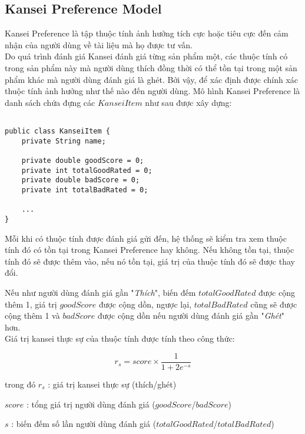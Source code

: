 \subsection{Kansei Preference Model}

Kansei Preference là tập thuộc tính ảnh hưởng tích cực hoặc tiêu cực đến cảm nhận của người dùng về tài liệu mà họ được tư vấn.\\

Do quá trình đánh giá Kansei đánh giá từng sản phẩm một, các thuộc tính có trong sản phẩm này mà người dùng thích đồng thời có thể tồn tại trong một sản phẩm khác mà người dùng đánh giá là ghét. Bởi vậy, để xác định được chính xác thuộc tính ảnh hưởng như thế nào đến người dùng. Mô hình Kansei Preference là danh sách chứa đựng các $KanseiItem$ như sau được xây dựng:

\begin{lstlisting}[style=javacode, breaklines=true]

public class KanseiItem {
    private String name;

    private double goodScore = 0;
    private int totalGoodRated = 0;
    private double badScore = 0;
    private int totalBadRated = 0;
    
    ...
}
\end{lstlisting}

Mỗi khi có thuộc tính được đánh giá gửi đến, hệ thống sẽ kiểm tra xem thuộc tính đó có tồn tại trong Kansei Preference hay không. Nếu không tồn tại, thuộc tính đó sẽ được thêm vào, nếu nó tồn tại, giá trị của thuộc tính đó sẽ được thay đổi.

Nếu như người dùng đánh giá gần "\textit{Thích}", biến đếm $totalGoodRated$ được cộng thêm 1, giá trị $goodScore$ được cộng dồn, ngược lại, $totalBadRated$ cũng sẽ được cộng thêm 1 và $badScore$ được cộng dồn nếu người dùng đánh giá gần "\textit{Ghét}" hơn.\\

Giá trị kansei thực sự của thuộc tính được tính theo công thức: 

\begin{equation}
r_s = score \times \dfrac{1}{1+2e^{-s}} 
\end{equation}

trong đó $r_s$ : giá trị kansei thực sự (thích/ghét)

$score$ : tổng giá trị người dùng đánh giá ($goodScore$/$badScore$)

$s$ : biến đếm số lần người dùng đánh giá ($totalGoodRated$/$totalBadRated$)\\

